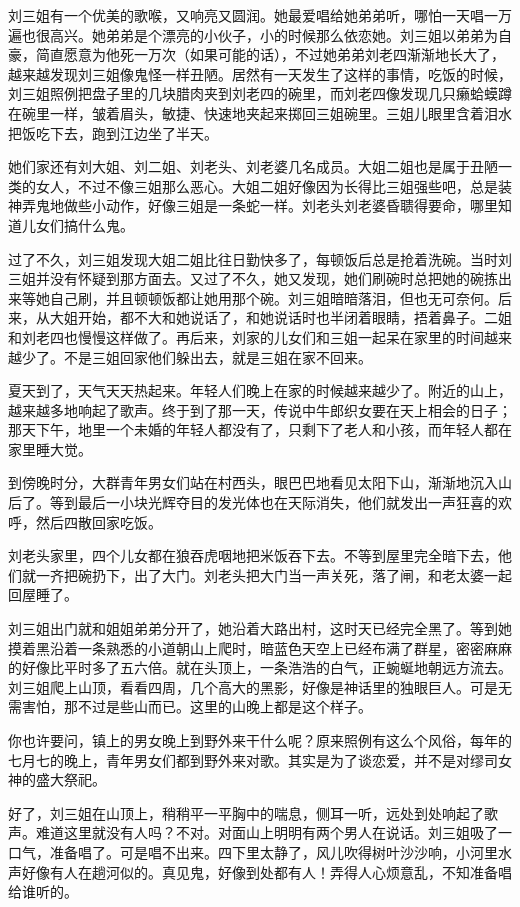  刘三姐有一个优美的歌喉，又响亮又圆润。她最爱唱给她弟弟听，哪怕一天唱一万遍也很高兴。她弟弟是个漂亮的小伙子，小的时候那么依恋她。刘三姐以弟弟为自豪，简直愿意为他死一万次（如果可能的话），不过她弟弟刘老四渐渐地长大了，越来越发现刘三姐像鬼怪一样丑陋。居然有一天发生了这样的事情，吃饭的时候，刘三姐照例把盘子里的几块腊肉夹到刘老四的碗里，而刘老四像发现几只癞蛤蟆蹲在碗里一样，皱着眉头，敏捷、快速地夹起来掷回三姐碗里。三姐儿眼里含着泪水把饭吃下去，跑到江边坐了半天。 
 
 她们家还有刘大姐、刘二姐、刘老头、刘老婆几名成员。大姐二姐也是属于丑陋一类的女人，不过不像三姐那么恶心。大姐二姐好像因为长得比三姐强些吧，总是装神弄鬼地做些小动作，好像三姐是一条蛇一样。刘老头刘老婆昏聩得要命，哪里知道儿女们搞什么鬼。 
 
 过了不久，刘三姐发现大姐二姐比往日勤快多了，每顿饭后总是抢着洗碗。当时刘三姐并没有怀疑到那方面去。又过了不久，她又发现，她们刷碗时总把她的碗拣出来等她自己刷，并且顿顿饭都让她用那个碗。刘三姐暗暗落泪，但也无可奈何。后来，从大姐开始，都不大和她说话了，和她说话时也半闭着眼睛，捂着鼻子。二姐和刘老四也慢慢这样做了。再后来，刘家的儿女们和三姐一起呆在家里的时间越来越少了。不是三姐回家他们躲出去，就是三姐在家不回来。 
 
 夏天到了，天气天天热起来。年轻人们晚上在家的时候越来越少了。附近的山上，越来越多地响起了歌声。终于到了那一天，传说中牛郎织女要在天上相会的日子；那天下午，地里一个未婚的年轻人都没有了，只剩下了老人和小孩，而年轻人都在家里睡大觉。 
 
 到傍晚时分，大群青年男女们站在村西头，眼巴巴地看见太阳下山，渐渐地沉入山后了。等到最后一小块光辉夺目的发光体也在天际消失，他们就发出一声狂喜的欢呼，然后四散回家吃饭。 
 
 刘老头家里，四个儿女都在狼吞虎咽地把米饭吞下去。不等到屋里完全暗下去，他们就一齐把碗扔下，出了大门。刘老头把大门当一声关死，落了闸，和老太婆一起回屋睡了。 
 
 刘三姐出门就和姐姐弟弟分开了，她沿着大路出村，这时天已经完全黑了。等到她摸着黑沿着一条熟悉的小道朝山上爬时，暗蓝色天空上已经布满了群星，密密麻麻的好像比平时多了五六倍。就在头顶上，一条浩浩的白气，正蜿蜒地朝远方流去。刘三姐爬上山顶，看看四周，几个高大的黑影，好像是神话里的独眼巨人。可是无需害怕，那不过是些山而已。这里的山晚上都是这个样子。 
 
 你也许要问，镇上的男女晚上到野外来干什么呢？原来照例有这么个风俗，每年的七月七的晚上，青年男女们都到野外来对歌。其实是为了谈恋爱，并不是对缪司女神的盛大祭祀。 
 
 好了，刘三姐在山顶上，稍稍平一平胸中的喘息，侧耳一听，远处到处响起了歌声。难道这里就没有人吗？不对。对面山上明明有两个男人在说话。刘三姐吸了一口气，准备唱了。可是唱不出来。四下里太静了，风儿吹得树叶沙沙响，小河里水声好像有人在趟河似的。真见鬼，好像到处都有人！弄得人心烦意乱，不知准备唱给谁听的。 
 
